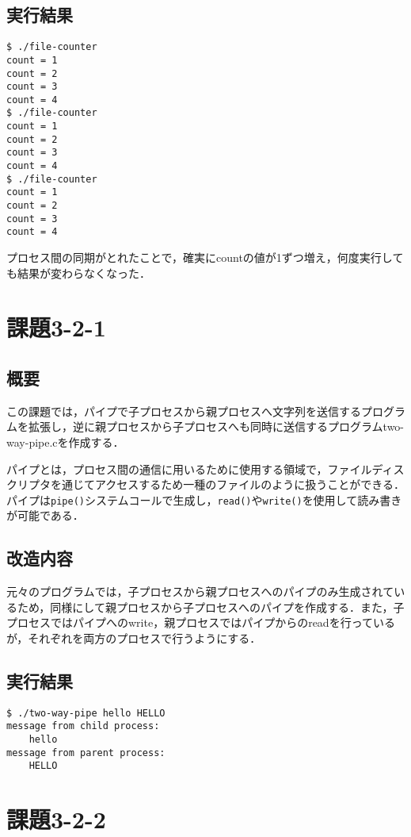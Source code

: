\documentclass[a4j,10pt,titlepage]{jsarticle}
\begin{document}
\subsection{実行結果}
\begin{verbatim}
$ ./file-counter
count = 1
count = 2
count = 3
count = 4
$ ./file-counter
count = 1
count = 2
count = 3
count = 4
$ ./file-counter
count = 1
count = 2
count = 3
count = 4
\end{verbatim}

プロセス間の同期がとれたことで，確実にcountの値が1ずつ増え，何度実行しても結果が変わらなくなった．

\section{課題3-2-1}
\subsection{概要}
この課題では，パイプで子プロセスから親プロセスへ文字列を送信するプログラムを拡張し，逆に親プロセスから子プロセスへも同時に送信するプログラムtwo-way-pipe.cを作成する．

パイプとは，プロセス間の通信に用いるために使用する領域で，ファイルディスクリプタを通じてアクセスするため一種のファイルのように扱うことができる．パイプは\verb|pipe()|システムコールで生成し，\verb|read()|や\verb|write()|を使用して読み書きが可能である．

\subsection{改造内容}
元々のプログラムでは，子プロセスから親プロセスへのパイプのみ生成されているため，同様にして親プロセスから子プロセスへのパイプを作成する．また，子プロセスではパイプへのwrite，親プロセスではパイプからのreadを行っているが，それぞれを両方のプロセスで行うようにする．

\subsection{実行結果}
\begin{verbatim}
$ ./two-way-pipe hello HELLO
message from child process: 
	hello
message from parent process: 
	HELLO
\end{verbatim}

\section{課題3-2-2}
\end{document}
